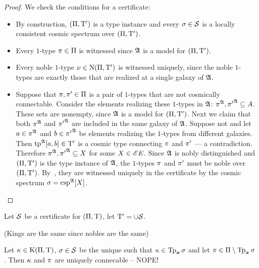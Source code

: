 \begin{proof}
We check the conditions for a certificate:
\begin{itemize}
  \item[\refcertcondIp] By construction, $(\Pi,{\mathrm{T}'})$ is a type instance
  and every $\sigma \in \mathcal{S}$ is a locally consistent cosmic spectrum over
  $(\Pi,{\mathrm{T}'})$.
  \item[\refcertcondIIp] Every $1$-type $\pi \in \Pi$ is witnessed since
  $\mathfrak{A}$ is a model for $(\Pi,{\mathrm{T}'})$.
  \item[\refcertcondIIIp] Every noble $1$-type $\nu \in \mathrm{\mathrm{N}}(\Pi,{\mathrm{T}'})$ is
  witnessed uniquely, since the noble $1$-types are exactly those that are
  realized at a single galaxy of $\mathfrak{A}$.
  \item[\refcertcondIVp] Suppose that $\pi, {\pi'} \in \Pi$ is a pair of
  $1$-types that are not cosmically connectable. Consider the elements realizing
  these $1$-types in $\mathfrak{A}$: $\pi^{\mathfrak{A}}, {\pi'}^{\mathfrak{A}} \subseteq A$.
  These sets are nonempty, since $\mathfrak{A}$ is a model for $(\Pi,{\mathrm{T}'})$.
  Next we claim that both $\pi^{\mathfrak{A}}$ and ${\pi'}^{\mathfrak{A}}$ are included in
  the same galaxy of $\mathfrak{A}$. Suppose not and let $a \in \pi^{\mathfrak{A}}$ and
  $b \in {\pi'}^{\mathfrak{A}}$ be elements realizing the $1$-types from different
  galaxies. Then $\operatorname{tp}^{\mathfrak{A}}[a,b] \in {\mathrm{T}'}$ is a cosmic type connecting
  $\pi$ and ${\pi'}$ --- a contradiction.
  Therefore $\pi^{\mathfrak{A}}, {\pi'}^{\mathfrak{A}} \subseteq X$ for some $X
  \in {\mathscr{E}E}$. Since $\mathfrak{A}$ is nobly distinguished and $(\Pi,{\mathrm{T}'})$ is
  the type instance of $\mathfrak{A}$, the $1$-types $\pi$ and ${\pi'}$ must be noble
  over $(\Pi,{\mathrm{T}'})$. By~, they are witnessed uniquely in
  the certificate by the cosmic spectrum $\sigma = \operatorname{csp}^{\mathfrak{A}}[X]$.
\end{itemize}
\end{proof}

\begin{lemma}
Let $\mathcal{S}$ be a certificate for $(\Pi,\mathrm{T})$,
let ${\mathrm{T}'} = \cup\mathcal{S}$.

(Kings are the same since nobles are the same)

Let $\kappa \in \mathrm{K}(\Pi,\mathrm{T})$, $\sigma\in\mathcal{S}$ be the unique such that $\kappa
\in \operatorname{Tp}_{\bm{x}}\sigma$ and let $\pi \in \Pi \setminus \operatorname{Tp}_{\bm{x}}\sigma$.
Then $\kappa$ and $\pi$ are uniquely connecable -- NOPE!
\end{lemma}

